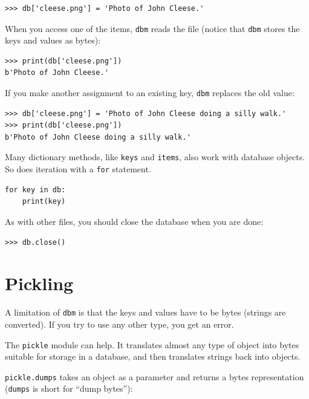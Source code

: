 \documentclass[10pt]{book}
\begin{document}


\beforeverb
\begin{verbatim}
>>> db['cleese.png'] = 'Photo of John Cleese.'
\end{verbatim}
\afterverb
%
When you access one of the items, {\tt dbm} reads the file (notice that {\tt dbm} stores the keys and values as bytes):

\beforeverb
\begin{verbatim}
>>> print(db['cleese.png'])
b'Photo of John Cleese.'
\end{verbatim}
\afterverb
%
If you make another assignment to an existing key, {\tt dbm} replaces
the old value:

\beforeverb
\begin{verbatim}
>>> db['cleese.png'] = 'Photo of John Cleese doing a silly walk.'
>>> print(db['cleese.png'])
b'Photo of John Cleese doing a silly walk.'
\end{verbatim}
\afterverb
%
Many dictionary methods, like {\tt keys} and {\tt items}, also
work with database objects.  So does iteration with a {\tt for}
statement.


\beforeverb
\begin{verbatim}
for key in db:
    print(key)
\end{verbatim}
\afterverb
%
As with other files, you should close the database when you are
done:

\beforeverb
\begin{verbatim}
>>> db.close()
\end{verbatim}
\afterverb
%



\section{Pickling}


A limitation of {\tt dbm} is that the keys and values have
to be bytes (strings are converted).  If you try to use any other type, you get an
error.


The {\tt pickle} module can help.  It translates
almost any type of object into bytes suitable for storage in a
database, and then translates strings back into objects.

{\tt pickle.dumps} takes an object as a parameter and returns
a bytes representation ({\tt dumps} is short for ``dump bytes''):
\end{document}
